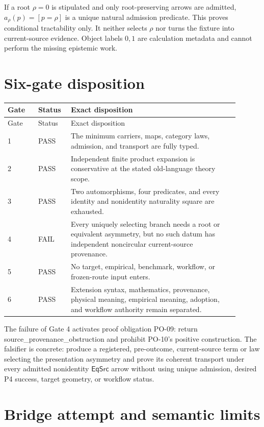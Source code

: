\documentclass[11pt]{article}
\newcommand{\EqSrc}{\mathsf{EqSrc}}
\newcommand{\status}[1]{\textsf{#1}}
\begin{document}
If a root $\rho=0$ is stipulated and only root-preserving arrows are admitted,
$a_\rho(p)=[p=\rho]$ is a unique natural admission predicate.  This proves
conditional tractability only.  It neither selects $\rho$ nor turns the
fixture into current-source evidence.  Object labels $0,1$ are calculation
metadata and cannot perform the missing epistemic work.

\section{Six-gate disposition}

\begin{longtable}{P{0.12\linewidth}P{0.12\linewidth}P{0.66\linewidth}}
\toprule
Gate & Status & Exact disposition \\
\midrule
\endfirsthead
\toprule
Gate & Status & Exact disposition \\
\midrule
{} & \status{PASS} & The minimum carriers, maps, category laws, admission, and transport are fully typed. \\
2 & \status{PASS} & Independent finite product expansion is conservative at the stated old-language theory scope. \\
3 & \status{PASS} & Two automorphisms, four predicates, and every identity and nonidentity naturality square are exhausted. \\
4 & \status{FAIL} & Every uniquely selecting branch needs a root or equivalent asymmetry, but no such datum has independent noncircular current-source provenance. \\
5 & \status{PASS} & No target, empirical, benchmark, workflow, or frozen-route input enters. \\
6 & \status{PASS} & Extension syntax, mathematics, provenance, physical meaning, empirical meaning, adoption, and workflow authority remain separated. \\
\bottomrule
\end{longtable}

The failure of Gate 4 activates proof obligation PO-09: return
\status{source\_provenance\_obstruction} and prohibit PO-10's positive
construction.  The falsifier is concrete: produce a registered, pre-outcome,
current-source term or law selecting the presentation asymmetry and prove its
coherent transport under every admitted nonidentity $\EqSrc$ arrow without
using unique admission, desired P4 success, target geometry, or workflow
status.

\section{Bridge attempt and semantic limits}
\end{document}
